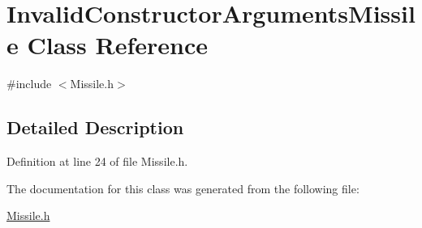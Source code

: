 \hypertarget{classInvalidConstructorArgumentsMissile}{\section{Invalid\-Constructor\-Arguments\-Missile Class Reference}
\label{classInvalidConstructorArgumentsMissile}
}


{\ttfamily \#include $<$Missile.\-h$>$}



\subsection{Detailed Description}


Definition at line 24 of file Missile.\-h.



The documentation for this class was generated from the following file\-:\begin{DoxyCompactItemize}
\item 
\hyperlink{Missile_8h}{Missile.\-h}\end{DoxyCompactItemize}
